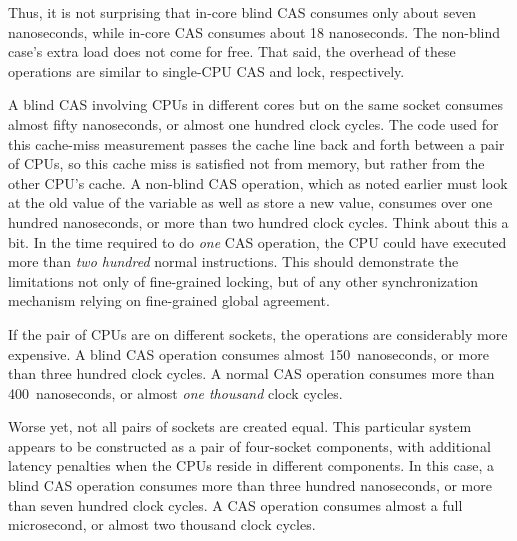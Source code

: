 Thus, it is not surprising that in-core blind CAS consumes only about
seven nanoseconds, while in-core CAS consumes about 18 nanoseconds.
The non-blind case's extra load does not come for free.
That said, the overhead of these operations are similar to single-CPU
CAS and lock, respectively.

\QuickQuizEnd

A blind CAS involving CPUs in different cores but on the same socket
consumes almost fifty nanoseconds, or almost one hundred clock cycles.
The code used for this cache-miss measurement passes the cache line
back and forth between a pair of CPUs, so this cache miss is satisfied
not from memory, but rather from the other CPU's cache.
A non-blind CAS operation, which as noted earlier must look at the old
value of the variable as well as store a new value, consumes over one
hundred nanoseconds, or more than two hundred clock cycles.
Think about this a bit.
In the time required to do \emph{one} CAS operation, the CPU could have
executed more than \emph{two hundred} normal instructions.
This should demonstrate the limitations not only of fine-grained locking,
but of any other synchronization mechanism relying on fine-grained
global agreement.

If the pair of CPUs are on different sockets, the operations are considerably
more expensive.
A blind CAS operation consumes almost 150~nanoseconds, or more than
three hundred clock cycles.
A normal CAS operation consumes more than 400~nanoseconds, or almost
\emph{one thousand} clock cycles.

Worse yet, not all pairs of sockets are created equal.
This particular system appears to be constructed as a pair of four-socket
components, with additional latency penalties when the CPUs reside
in different components.
In this case, a blind CAS operation consumes more than three hundred
nanoseconds, or more than seven hundred clock cycles.
A CAS operation consumes almost a full microsecond, or almost two
thousand clock cycles.

